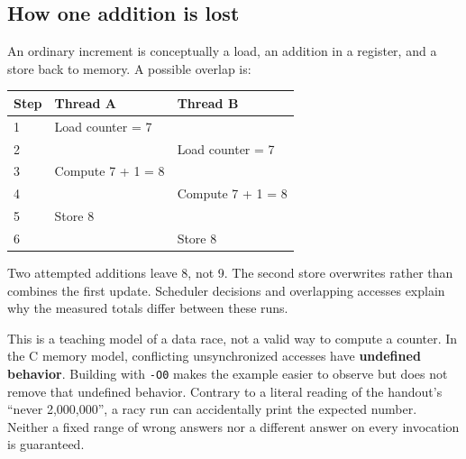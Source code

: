 \documentclass[12pt]{article}
\begin{document}
\subsection{How one addition is lost}
An ordinary increment is conceptually a load, an addition in a register,
and a store back to memory. A possible overlap is:
\begin{center}
\begin{tabular}{lll}
\toprule
Step & Thread A & Thread B \\
\midrule
1 & Load counter = 7 & \\
2 & & Load counter = 7 \\
3 & Compute 7 + 1 = 8 & \\
4 & & Compute 7 + 1 = 8 \\
5 & Store 8 & \\
6 & & Store 8 \\
\bottomrule
\end{tabular}
\end{center}
Two attempted additions leave 8, not 9. The second store overwrites rather
than combines the first update. Scheduler decisions and overlapping
accesses explain why the measured totals differ between these runs.

This is a teaching model of a data race, not a valid way to compute a
counter. In the C memory model, conflicting unsynchronized accesses have
\textbf{undefined behavior}. Building with \texttt{-O0} makes the example
easier to observe but does not remove that undefined behavior. Contrary to
a literal reading of the handout's ``never 2,000,000'', a racy run can
accidentally print the expected number. Neither a fixed range of wrong
answers nor a different answer on every invocation is guaranteed.

\clearpage
\end{document}
